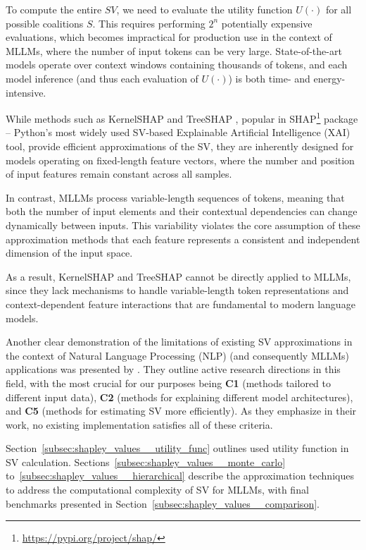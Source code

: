 \newpage
To compute the entire $SV$, we need to evaluate the utility function $U(\cdot)$ for all possible coalitions $S$. This requires performing $2^n$ potentially expensive evaluations, which becomes impractical for production use in the context of MLLMs, where the number of input tokens can be very large. State-of-the-art models operate over context windows containing thousands of tokens, and each model inference (and thus each evaluation of $U(\cdot)$) is both time- and energy-intensive.

While methods such as KernelSHAP \parencite{lundberg2017unifiedapproachinterpretingmodel} and TreeSHAP \parencite{yang2022fasttreeshapacceleratingshap}, popular in SHAP\footnote{\url{https://pypi.org/project/shap/}} package -- Python's most widely used SV-based Explainable Artificial Intelligence (XAI) tool, provide efficient approximations of the SV, they are inherently designed for models operating on fixed-length feature vectors, where the number and position of input features remain constant across all samples.

In contrast, MLLMs process variable-length sequences of tokens, meaning that both the number of input elements and their contextual dependencies can change dynamically between inputs. This variability violates the core assumption of these approximation methods that each feature represents a consistent and independent dimension of the input space.

As a result, KernelSHAP and TreeSHAP cannot be directly applied to MLLMs, since they lack mechanisms to handle variable-length token representations and context-dependent feature interactions that are fundamental to modern language models.

Another clear demonstration of the limitations of existing SV approximations in the context of Natural Language Processing (NLP) (and consequently MLLMs) applications was presented by \textcite{mosca-etal-2022-shap}. They outline active research directions in this field, with the most crucial for our purposes being \textbf{C1} (methods tailored to different input data), \textbf{C2} (methods for explaining different model architectures), and \textbf{C5} (methods for estimating SV more efficiently). As they emphasize in their work, no existing implementation satisfies all of these criteria.

Section~\ref{subsec:shapley_values__utility_func} outlines used utility function in SV calculation. Sections~\ref{subsec:shapley_values__monte_carlo} to~\ref{subsec:shapley_values__hierarchical} describe the approximation techniques to address the computational complexity of SV for MLLMs, with final benchmarks presented in Section~\ref{subsec:shapley_values__comparison}.

